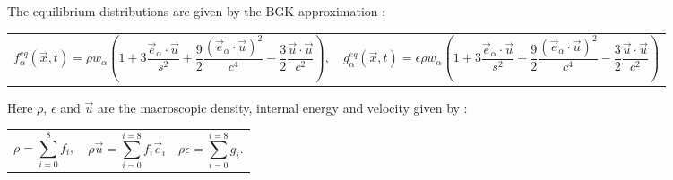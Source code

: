 \documentclass{article}
\begin{document}
\noindent The equilibrium distributions are given by the BGK approximation \cite{qian1992lattice, rothman2004lattice}:
\newline
\begin{tabularx}{\textwidth}{XX}
\begin{equation}
	f^{eq}_{\alpha}(\vec{x}, t)  = \rho w_{\alpha} (1 + 3 \frac{\vec{e}_{\alpha} \cdot \vec{u}}{s^2} + \frac{9}{2} \frac{(\vec{e}_{\alpha} \cdot \vec{u}  )^2}{c^4} - \frac{3}{2} \frac{\vec{u} \cdot \vec{u}}{c^2}  ),
\end{equation}
    &
\begin{equation}
	g^{eq}_{\alpha}(\vec{x}, t)  = \epsilon \rho w_{\alpha} (1 + 3 \frac{\vec{e}_{\alpha} \cdot \vec{u}}{s^2} + \frac{9}{2} \frac{(\vec{e}_{\alpha} \cdot \vec{u}  )^2}{c^4} - \frac{3}{2} \frac{\vec{u} \cdot \vec{u}}{c^2}  )
\end{equation}
\end{tabularx}\par

\noindent Here $\rho$, $\epsilon$ and $\vec{u}$ are the macroscopic density, internal energy and velocity given by \cite{mora2017simulation}:

\begin{tabularx}{\textwidth}{XXX}
\begin{equation}
	\rho = \sum_{i=0}^{8} f_{i},
	\label{LBM rho}
\end{equation}
    &
\begin{equation}
	\rho \vec{u} = \sum_{i=0}^{i=8} f_{i} \vec{e}_{i}
	\label{LBM u}
\end{equation}
	&
\begin{equation}
	\rho \epsilon = \sum_{i=0}^{i=8} g_{i}.
	\label{LBM ep}
\end{equation}
\end{tabularx}\par
\end{document}
